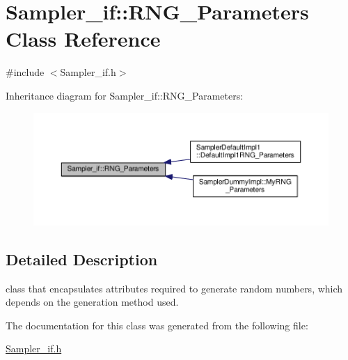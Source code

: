 \hypertarget{class_sampler__if_1_1_r_n_g___parameters}{}\section{Sampler\+\_\+if\+:\+:R\+N\+G\+\_\+\+Parameters Class Reference}
\label{class_sampler__if_1_1_r_n_g___parameters}


{\ttfamily \#include $<$Sampler\+\_\+if.\+h$>$}



Inheritance diagram for Sampler\+\_\+if\+:\+:R\+N\+G\+\_\+\+Parameters\+:\nopagebreak
\begin{figure}[H]
\begin{center}
\leavevmode
\includegraphics[width=350pt]{class_sampler__if_1_1_r_n_g___parameters__inherit__graph}
\end{center}
\end{figure}


\subsection{Detailed Description}
class that encapsulates attributes required to generate random numbers, which depends on the generation method used. 

The documentation for this class was generated from the following file\+:\begin{DoxyCompactItemize}
\item 
\hyperlink{_sampler__if_8h}{Sampler\+\_\+if.\+h}\end{DoxyCompactItemize}
